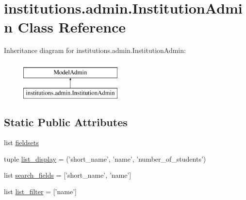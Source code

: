 \hypertarget{classinstitutions_1_1admin_1_1_institution_admin}{\section{institutions.\-admin.\-Institution\-Admin Class Reference}
\label{classinstitutions_1_1admin_1_1_institution_admin}
}
Inheritance diagram for institutions.\-admin.\-Institution\-Admin\-:\begin{figure}[H]
\begin{center}
\leavevmode
\includegraphics[height=2.000000cm]{classinstitutions_1_1admin_1_1_institution_admin}
\end{center}
\end{figure}
\subsection*{Static Public Attributes}
\begin{DoxyCompactItemize}
\item 
list \hyperlink{classinstitutions_1_1admin_1_1_institution_admin_a5ed5136c42c55990a316c065557d9aa0}{fieldsets}
\item 
tuple \hyperlink{classinstitutions_1_1admin_1_1_institution_admin_a70f957c33592da810f9f9317d8cc13ad}{list\-\_\-display} = ('short\-\_\-name', 'name', 'number\-\_\-of\-\_\-students')
\item 
list \hyperlink{classinstitutions_1_1admin_1_1_institution_admin_ade305dfb85c4bc85b22046a73e047bb8}{search\-\_\-fields} = \mbox{[}'short\-\_\-name', 'name'\mbox{]}
\item 
list \hyperlink{classinstitutions_1_1admin_1_1_institution_admin_a60e733a2e3a09bdcf381fb1ad1146100}{list\-\_\-filter} = \mbox{[}'name'\mbox{]}
\end{DoxyCompactItemize}


